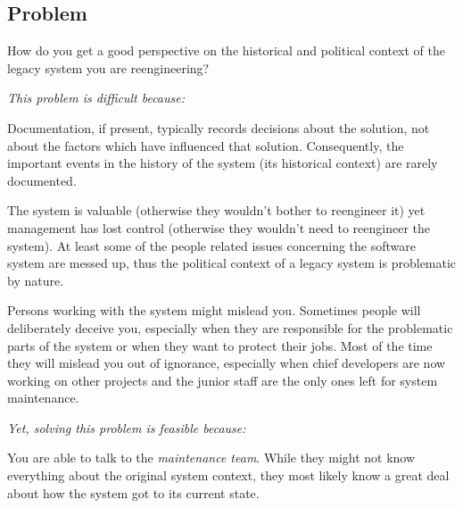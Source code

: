 \documentclass[a4paper,10pt,twoside]{book}
\begin{document}


\subsection*{Problem}

How do you get a good perspective on the historical and political context of the legacy system you are reengineering?

\emph{This problem is difficult because:}

\begin{bulletlist}
  \item Documentation, if present, typically records decisions about the solution, not about the factors which have influenced that solution. Consequently, the important events in the history of the system (\ie its historical context) are rarely documented.

  \item The system is valuable (otherwise they wouldn't bother to reengineer it) yet management has lost control (otherwise they wouldn't need to reengineer the system). At least some of the people related issues concerning the software system are messed up, thus the political context of a legacy system is problematic by nature.

  \item Persons working with the system might mislead you. Sometimes people will deliberately deceive you, especially when they are responsible for the problematic parts of the system or when they want to protect their jobs. Most of the time they will mislead you out of ignorance, especially when chief developers are now working on other projects and the junior staff are the only ones left for system maintenance.

\end{bulletlist}

\emph{Yet, solving this problem is feasible because:}

\begin{bulletlist}
  \item You are able to talk to the \emph{maintenance team}. While they might not know everything about the original system context, they most likely know a great deal about how the system got to its current state.
\end{bulletlist}
\end{document}
